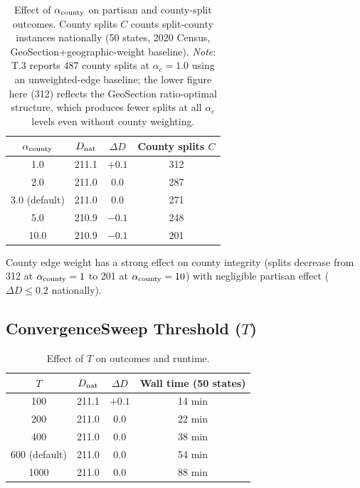\begin{table}[h]
\centering
\caption{Effect of $\alpha_{\mathrm{county}}$ on partisan and county-split outcomes.
         County splits $C$ counts split-county instances nationally (50 states,
         2020 Census, GeoSection+geographic-weight baseline).
         \emph{Note}: T.3 reports 487 county splits at $\alpha_c=1.0$ using
         an unweighted-edge baseline; the lower figure here (312) reflects the
         GeoSection ratio-optimal structure, which produces fewer splits at
         all $\alpha_c$ levels even without county weighting.}
\label{tab:acounty-results}
\begin{tabular}{cccc}
\toprule
$\alpha_{\mathrm{county}}$ & $D_{\rm nat}$ & $\Delta D$ & County splits $C$ \\
\midrule
1.0  & 211.1 & $+0.1$ & 312 \\
2.0  & 211.0 & 0.0    & 287 \\
3.0 (default) & 211.0 & 0.0 & 271 \\
5.0  & 210.9 & $-0.1$ & 248 \\
10.0 & 210.9 & $-0.1$ & 201 \\
\bottomrule
\end{tabular}
\end{table}

County edge weight has a strong effect on county integrity (splits decrease
from 312 at $\alpha_{\mathrm{county}} = 1$ to 201 at $\alpha_{\mathrm{county}} = 10$) with negligible
partisan effect ($\Delta D \leq 0.2$ nationally).

\subsection{ConvergenceSweep Threshold ($T$)}

\begin{table}[h]
\centering
\caption{Effect of $T$ on outcomes and runtime.}
\label{tab:T-results}
\begin{tabular}{cccc}
\toprule
$T$ & $D_{\rm nat}$ & $\Delta D$ & Wall time (50 states) \\
\midrule
100  & 211.1 & $+0.1$ & 14 min \\
200  & 211.0 & 0.0    & 22 min \\
400  & 211.0 & 0.0    & 38 min \\
600 (default) & 211.0 & 0.0 & 54 min \\
1000 & 211.0 & 0.0    & 88 min \\
\bottomrule
\end{tabular}
\end{table}

